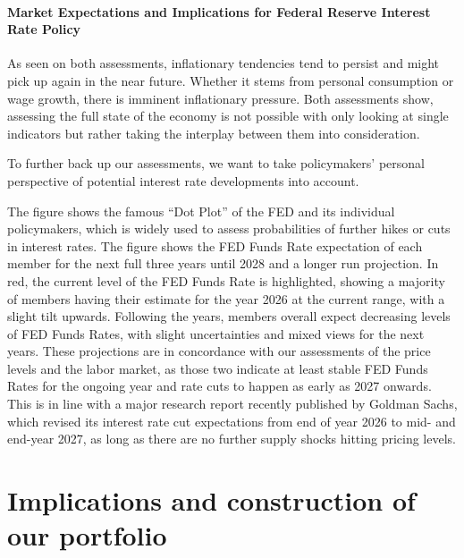 \documentclass[11pt,a4paper]{article}
\begin{document}
\paragraph{Market Expectations and Implications for Federal Reserve Interest Rate Policy}

As seen on both assessments, inflationary tendencies tend to persist and might pick up again in the near future. Whether it stems from personal consumption or wage growth, there is imminent inflationary pressure. Both assessments show, assessing the full state of the economy is not possible with only looking at single indicators but rather taking the interplay between them into consideration.

To further back up our assessments, we want to take policymakers' personal perspective of potential interest rate developments into account.


The figure shows the famous ``Dot Plot'' of the FED and its individual policymakers, which is widely used to assess probabilities of further hikes or cuts in interest rates. The figure shows the FED Funds Rate expectation of each member for the next full three years until 2028 and a longer run projection. In red, the current level of the FED Funds Rate is highlighted, showing a majority of members having their estimate for the year 2026 at the current range, with a slight tilt upwards. Following the years, members overall expect decreasing levels of FED Funds Rates, with slight uncertainties and mixed views for the next years. These projections are in concordance with our assessments of the price levels and the labor market, as those two indicate at least stable FED Funds Rates for the ongoing year and rate cuts to happen as early as 2027 onwards. This is in line with a major research report recently published by Goldman Sachs, which revised its interest rate cut expectations from end of year 2026 to mid- and end-year 2027, as long as there are no further supply shocks hitting pricing levels.

\section{Implications and construction of our portfolio}
\end{document}

